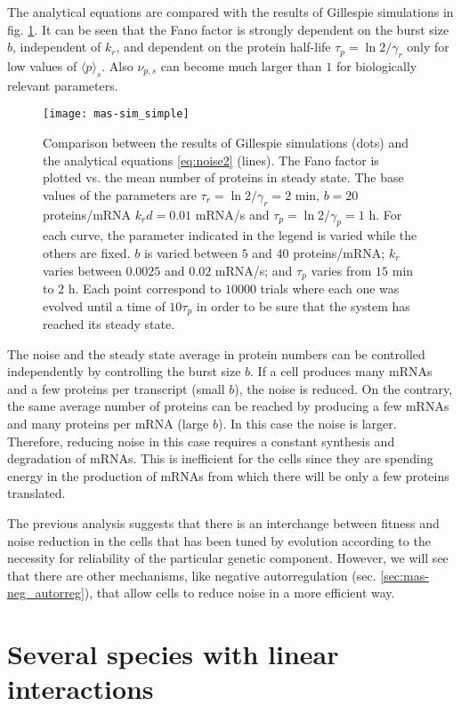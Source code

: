 The analytical equations are compared with the results of Gillespie simulations in fig. \ref{fig:mas-sim_simple}. It can be seen that the Fano factor is strongly dependent on the burst size $b$, independent of $k_r$, and dependent on the protein half-life $\tau_p = \ln2/\gamma_r$ only for low values of $\langle p\rangle_s$. Also $\nu_{p,s}$ can become much larger than $1$ for biologically relevant parameters.
\begin{figure}[H]
  \centering
  \texttt{[image: mas-sim\_simple]}
  \caption[Noise in proteins: comparing analytical results and Gillespie simulations]{\label{fig:mas-sim_simple} Comparison between the results of Gillespie simulations (dots) and the analytical equations \eqref{eq:noise2} (lines). The Fano factor is plotted vs. the mean number of proteins in steady state. The base values of the parameters are $\tau_r = \ln2/\gamma_r = 2$ min,  $b=20$ proteins/mRNA $k_rd = 0.01$ mRNA/s and $\tau_p = \ln2/\gamma_p = 1$ h. For each curve, the parameter indicated in the legend is varied while the others are fixed. $b$ is varied between $5$ and $40$ proteins/mRNA; $k_r$ varies between $0.0025$ and $0.02$ mRNA/s; and $\tau_p$ varies from $15$ min to $2$ h. Each point correspond to $10000$ trials where each one was evolved until a time of $10\tau_p$ in order to be sure that the system has reached its steady state.}
\end{figure}

The noise and the steady state average in protein numbers can be controlled independently by controlling the burst size $b$. If a cell produces many mRNAs and a few proteins per transcript (small $b$), the noise is reduced. On the contrary, the same average number of proteins can be reached by producing a few mRNAs and many proteins per mRNA (large $b$). In this case the noise is larger. Therefore, reducing noise in this case requires a constant synthesis and degradation of mRNAs. This is inefficient for the cells since they are spending energy in the production of mRNAs from which there will be only a few proteins translated. 

The previous analysis suggests that there is an interchange between fitness and noise reduction in the cells that has been tuned by evolution according to the necessity for reliability of the particular genetic component. However, we will see that there are other mechanisms, like negative autorregulation (sec. \ref{sec:mas-neg_autorreg}), that allow cells to reduce noise in a more efficient way.

\section{Several species with linear interactions}

